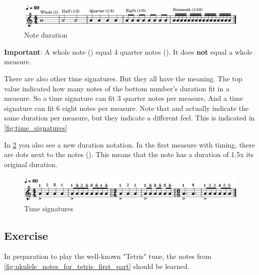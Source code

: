 \begin{figure}[h]
	\centering
	\includegraphics[width=\textwidth]{../../MuseScore/Ukulele/MusicNotation/NoteDurations_Basic.png}
	\caption{Note duration}
	\label{fig:ukulele_note_duration_basic}
\end{figure}

\textbf{Important}: A whole note (\wholeNote) equal 4 quarter notes (\quarterNote). It does \textbf{not} equal a whole measure. \newline

There are also other time signatures. But they all have the meaning. The top value indicated how many notes of the bottom number's duration fit in a measure. So a  time signature can fit 3 quarter notes per measure. And a  time signature can fit 6 eight notes per measure. Note that  and  actually indicate the same duration per measure, but they indicate a different feel. This is indicated in \ref{fig:time_signatures}

In \ref{fig:ukulele_time_signatures} you also see a new duration notation. In the first measure with  timing, there are dots next to the notes (\quarterNoteDottedDown). This means that the note has a duration of 1.5x its original duration.

\begin{figure}[h]
	\centering
	\includegraphics[width=\textwidth]{../../MuseScore/Ukulele/MusicNotation/TimeSignature.png}
	\caption{Time signatures}
	\label{fig:ukulele_time_signatures}
\end{figure}

\newpage

\subsection{Exercise}

In preparation to play the well-known "Tetris" tune, the notes from \ref{fig:ukulele_notes_for_tetris_first_part} should be learned.


